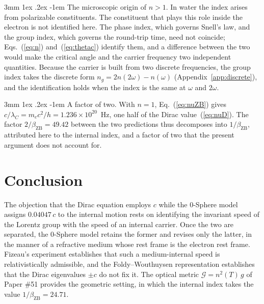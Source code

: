 \documentclass[%
 reprint, amsmath,amssymb, aps, prb, ]{revtex4-2}
\makeatletter
\numberwithin{equation}{section}
\renewcommand\paragraph{%
  \@startsection{paragraph}{4}{\z@}%
    {3mm \@plus 1ex \@minus .2ex}%
    {-1em}%
    {\normalfont\normalsize\itshape}}
\makeatother
\begin{document}
\paragraph{The microscopic origin of $n > 1$.} In water the index arises from polarizable constituents. The constituent that plays this role inside the electron is not identified here. The phase index, which governs Snell's law, and the group index, which governs the round-trip time, need not coincide; Eqs.~(\ref{eq:n}) and~(\ref{eq:thetac}) identify them, and a difference between the two would make the critical angle and the carrier frequency two independent quantities. Because the carrier is built from two discrete frequencies, the group index takes the discrete form $n_g = 2n(2\omega) - n(\omega)$ (Appendix~\ref{app:discrete}), and the identification holds when the index is the same at $\omega$ and $2\omega$.

\paragraph{A factor of two.} With $n = 1$, Eq.~(\ref{eq:nuZB}) gives $c/\lambda_C = m_ec^2/h = 1.236\times10^{20}$~Hz, one half of the Dirac value~(\ref{eq:nuD}). The factor $2/\beta_{\text{ZB}} = 49.42$ between the two predictions thus decomposes into $1/\beta_{\text{ZB}}$, attributed here to the internal index, and a factor of two that the present argument does not account for.

\section{Conclusion}

The objection that the Dirac equation employs $c$ while the 0-Sphere model assigns $0.04047\,c$ to the internal motion rests on identifying the invariant speed of the Lorentz group with the speed of an internal carrier. Once the two are separated, the 0-Sphere model retains the former and revises only the latter, in the manner of a refractive medium whose rest frame is the electron rest frame. Fizeau's experiment establishes that such a medium-internal speed is relativistically admissible, and the Foldy--Wouthuysen representation establishes that the Dirac eigenvalues $\pm c$ do not fix it. The optical metric $\mathcal{G} = n^2(T)\,g$ of Paper \#51 provides the geometric setting, in which the internal index takes the value $1/\beta_{\text{ZB}} = 24.71$.
\end{document}
